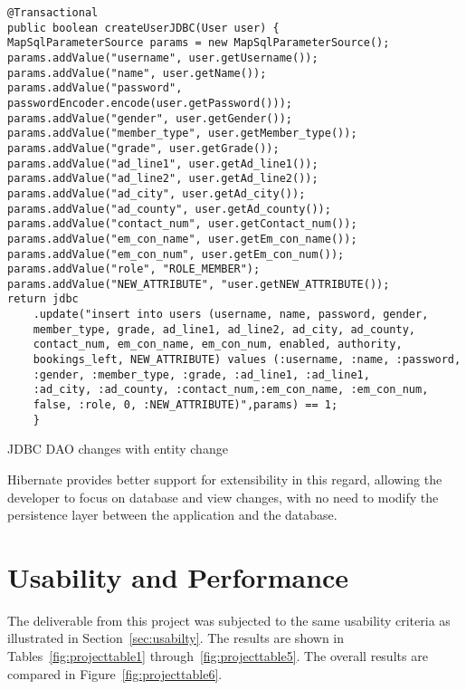 \begin{lstlisting}
@Transactional
public boolean createUserJDBC(User user) {
MapSqlParameterSource params = new MapSqlParameterSource();
params.addValue("username", user.getUsername());
params.addValue("name", user.getName());
params.addValue("password", passwordEncoder.encode(user.getPassword()));
params.addValue("gender", user.getGender());
params.addValue("member_type", user.getMember_type());
params.addValue("grade", user.getGrade());
params.addValue("ad_line1", user.getAd_line1());
params.addValue("ad_line2", user.getAd_line2());
params.addValue("ad_city", user.getAd_city());
params.addValue("ad_county", user.getAd_county());
params.addValue("contact_num", user.getContact_num());
params.addValue("em_con_name", user.getEm_con_name());
params.addValue("em_con_num", user.getEm_con_num());
params.addValue("role", "ROLE_MEMBER");
params.addValue("NEW_ATTRIBUTE", "user.getNEW_ATTRIBUTE());
return jdbc
	.update("insert into users (username, name, password, gender, 
	member_type, grade, ad_line1, ad_line2, ad_city, ad_county,
	contact_num, em_con_name, em_con_num, enabled, authority,
	bookings_left, NEW_ATTRIBUTE) values (:username, :name, :password, 
	:gender, :member_type, :grade, :ad_line1, :ad_line1, 
	:ad_city, :ad_county, :contact_num,:em_con_name, :em_con_num,
	false, :role, 0, :NEW_ATTRIBUTE)",params) == 1;
	}
\end{lstlisting}
\begin{table}[H]
\caption{JDBC DAO changes with entity change}
\label{fig:jdbcChanges}
\end{table}

Hibernate provides better support for extensibility in this regard, allowing the developer to focus on database and view changes, with no need to modify the persistence layer between the application and the database.

\section{Usability and Performance}

The deliverable from this project was subjected to the same usability criteria as illustrated in Section~\ref{sec:usabilty}. The results are shown in Tables~\ref{fig:projecttable1} through~\ref{fig:projecttable5}. The overall results are compared in Figure~\ref{fig:projecttable6}.

